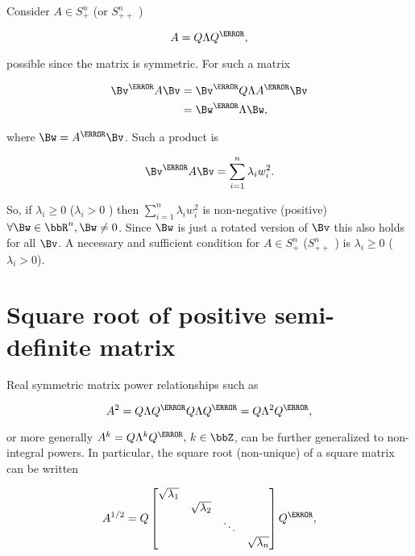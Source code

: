 Consider \( A \in S^n_{+} \) (or \( S^n_{++} \) )

\begin{dmath}\label{eqn:convexOptimizationLecture3:200}
A = Q \Lambda Q^\T,
\end{dmath}

possible since the matrix is symmetric.  For such a matrix

\begin{dmath}\label{eqn:convexOptimizationLecture3:220}
\begin{aligned}
\Bv^\T A \Bv
&=
\Bv^\T Q \Lambda A^\T \Bv \\
&=
\Bw^\T \Lambda \Bw,
\end{aligned}
\end{dmath}

where \( \Bw = A^\T \Bv \).  Such a product is

\begin{dmath}\label{eqn:convexOptimizationLecture3:240}
\Bv^\T A \Bv
=
\sum_{i = 1}^n \lambda_i w_i^2.
\end{dmath}

So, if \( \lambda_i \ge 0 \) (\(\lambda_i > 0 \) ) then \( \sum_{i = 1}^n \lambda_i w_i^2 \) is non-negative (positive) \( \forall \Bw \in \bbR^n, \Bw \ne 0 \).  Since \( \Bw \) is just a rotated version of \( \Bv \) this also holds for all \( \Bv \).  A necessary and sufficient condition for \( A \in S^n_{+} \) (\( S^n_{++} \) ) is \( \lambda_i \ge 0 \) (\(\lambda_i > 0\)).

\section{Square root of positive semi-definite matrix}

Real symmetric matrix power relationships such as

\begin{dmath}\label{eqn:convexOptimizationLecture3:260}
A^2
=
Q \Lambda Q^\T
Q \Lambda Q^\T
=
Q \Lambda^2
Q^\T
,
\end{dmath}

or more generally \( A^k = Q \Lambda^k Q^\T,\, k \in \bbZ \), can be further generalized to non-integral powers.  In particular, the square root (non-unique) of a square matrix can be written

\begin{dmath}\label{eqn:convexOptimizationLecture3:280}
A^{1/2} = Q
\begin{bmatrix}
\sqrt{\lambda_1} &                  &        &  \\
                 & \sqrt{\lambda_2} &        & \\
                 &                  & \ddots & \\
                 &                  &        & \sqrt{\lambda_n} \\
\end{bmatrix}
Q^\T,
\end{dmath}

